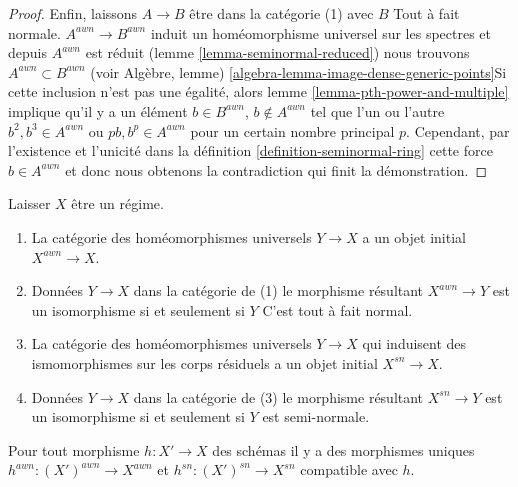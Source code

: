 \begin{proof}
\medskip\noindent

Enfin, laissons $A \to B$ être dans la catégorie (1) avec $B$ Tout à fait normale. $A^{awn} \to B^{awn}$ induit un homéomorphisme universel sur les spectres et depuis $A^{awn}$ est réduit (lemme \ref{lemma-seminormal-reduced}) nous trouvons
$A^{awn} \subset B^{awn}$
(voir Algèbre, lemme) \ref{algebra-lemma-image-dense-generic-points}Si cette inclusion n'est pas une égalité, alors lemme \ref{lemma-pth-power-and-multiple}
implique qu'il y a un élément $b \in B^{awn}$, $b \not \in A^{awn}$
tel que l'un ou l'autre $b^2, b^3 \in A^{awn}$ ou $pb, b^p \in A^{awn}$
pour un certain nombre principal $p$. Cependant, par l'existence et l'unicité dans la définition \ref{definition-seminormal-ring} cette force $b \in A^{awn}$
et donc nous obtenons la contradiction qui finit la démonstration.

\end{proof}

\begin{lemma}

\label{lemma-seminormalization}

Laisser $X$ être un régime.

\begin{enumerate}

\item La catégorie des homéomorphismes universels $Y \to X$ a un objet initial $X^{awn} \to X$.
\item Données $Y \to X$ dans la catégorie de (1) le morphisme résultant
$X^{awn} \to Y$ est un isomorphisme si et seulement si $Y$ C'est tout à fait normal.
\item La catégorie des homéomorphismes universels $Y \to X$ qui induisent des ismomorphismes sur les corps résiduels a un objet initial
$X^{sn} \to X$.
\item Données $Y \to X$ dans la catégorie de (3) le morphisme résultant
$X^{sn} \to Y$ est un isomorphisme si et seulement si $Y$ est semi-normale.

\end{enumerate}

Pour tout morphisme $h : X' \to X$ des schémas il y a des morphismes uniques
$h^{awn} : (X')^{awn} \to X^{awn}$ et $h^{sn} : (X')^{sn} \to X^{sn}$
compatible avec $h$.

\end{lemma}

